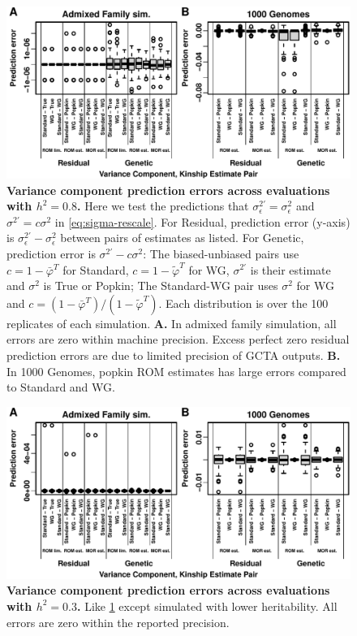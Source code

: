 \documentclass[11pt]{article}
\begin{document}
\begin{figure}[bp!]
  \centering
  \includegraphics[width=\textwidth]{preds-reml-errors.pdf}
  \caption{
    {\bf Variance component prediction errors across evaluations with $h^2=0.8$.}
    Here we test the predictions that $\sigma^{2\prime}_\epsilon = \sigma^2_\epsilon$ and $\sigma^{2\prime} = c \sigma^2$ in \cref{eq:sigma-rescale}.
    For Residual, prediction error (y-axis) is $\sigma^{2\prime}_\epsilon - \sigma^2_\epsilon$ between pairs of estimates as listed.
    For Genetic, prediction error is $\sigma^{2\prime} - c \sigma^2$:
    The biased-unbiased pairs use $c = 1 - \bar{\varphi}^T$ for Standard, $c = 1 - \tilde{\varphi}^T$ for WG, $\sigma^{2\prime}$ is their estimate and $\sigma^2$ is True or Popkin;
    The Standard-WG pair uses $\sigma^2$ for WG and $c = \left( 1 - \bar{\varphi}^T \right) / \left( 1 - \tilde{\varphi}^T \right)$.
    Each distribution is over the 100 replicates of each simulation.
    \textbf{A.}
    In admixed family simulation, all errors are zero within machine precision.
    Excess perfect zero residual prediction errors are due to limited precision of GCTA outputs.
    \textbf{B.}
    In 1000 Genomes, popkin ROM estimates has large errors compared to Standard and WG.
  }
  \label{fig:preds-reml-errors}
\end{figure}

\begin{figure}[bp!]
  \centering
  \includegraphics[width=\textwidth]{h-0.3/preds-reml-errors.pdf}
  \caption{
    {\bf Variance component prediction errors across evaluations with $h^2=0.3$.}
    Like \cref{fig:preds-reml-errors} except simulated with lower heritability.
    All errors are zero within the reported precision.
  }
  \label{fig:preds-reml-errors-h3}
\end{figure}
\end{document}
